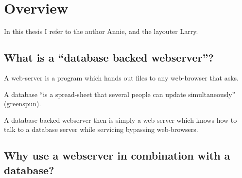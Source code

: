 
\chapter{Overview}

In this thesis I refer to the author Annie, and the layouter Larry.

\section{What is a ``database backed webserver''?}

A web-server is a program which hands out files to any web-browser
that asks.

A database ``is a spread-sheet that several people can update
simultaneously'' (\textsf{greenspun}).

A database backed webserver then is simply a web-server which knows how
to talk to a database server while servicing bypassing web-browsers.






\section{Why use a webserver in combination with a database?}
\label{sec:why-use-a-webserver-in-combination-with-a-database}

